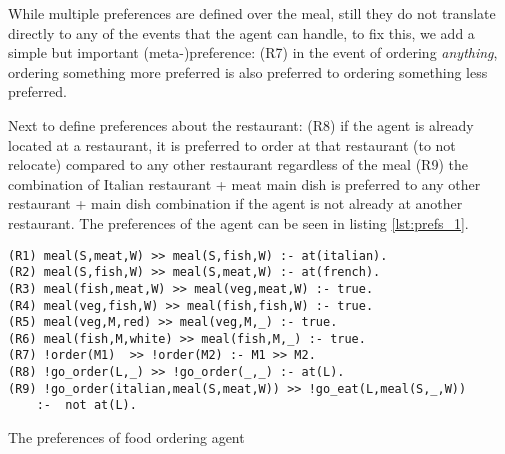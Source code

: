 \documentclass[sigconf,anonymous]{aamas}
\begin{document}


While multiple preferences are defined over the meal, still they do not translate directly to any of the events that the agent can handle, to fix this, we add a simple but important (meta-)preference: (R7) in the event of ordering \textit{anything}, ordering something more preferred is also preferred to ordering something less preferred.%

Next to define preferences about the restaurant: (R8) if the agent is already located at a restaurant, it is preferred to order at that restaurant (to not relocate) compared to {any} other restaurant regardless of the meal (R9) the combination of Italian restaurant + meat main dish is preferred to any other restaurant + main dish combination if the agent is not already at another restaurant. The preferences of the agent can be seen in listing \ref{lst:prefs_1}.


\begin{listing}[!tbh]
\centering
\begin{verbatim}
(R1) meal(S,meat,W) >> meal(S,fish,W) :- at(italian).
(R2) meal(S,fish,W) >> meal(S,meat,W) :- at(french).
(R3) meal(fish,meat,W) >> meal(veg,meat,W) :- true.
(R4) meal(veg,fish,W) >> meal(fish,fish,W) :- true.
(R5) meal(veg,M,red) >> meal(veg,M,_) :- true.
(R6) meal(fish,M,white) >> meal(fish,M,_) :- true.
(R7) !order(M1)  >> !order(M2) :- M1 >> M2.
(R8) !go_order(L,_) >> !go_order(_,_) :- at(L).
(R9) !go_order(italian,meal(S,meat,W)) >> !go_eat(L,meal(S,_,W)) 
    :-  not at(L).
\end{verbatim}
    \caption{The preferences of food ordering agent}
    \label{lst:prefs_1}
\end{listing}
\end{document}
